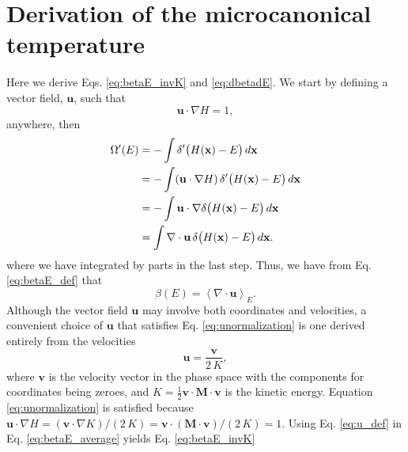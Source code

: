 \documentclass[reprint]{revtex4-1}
\begin{document}
\appendix


\section{Derivation of the microcanonical temperature}


Here we derive Eqs. \eqref{eq:betaE_invK} and \eqref{eq:dbetadE}.
We start by defining a vector field, $\mathbf u$,
such that
%
\begin{equation}
  \mathbf u \cdot \nabla H = 1
  ,
  \label{eq:unormalization}
\end{equation}
%
anywhere, then
%
\begin{align}
  \Omega'(E)
  &= -\int \delta'\bigl( H(\mathbf x) - E \bigr) \, d\mathbf x
     \notag \\
  &= -\int (\mathbf u \cdot \nabla H) \,
           \delta'\bigl( H(\mathbf x) - E \bigr) \, d\mathbf x
     \notag \\
  &= -\int \mathbf u \cdot
           \nabla \delta\bigl( H(\mathbf x) - E \bigr) \, d\mathbf x
     \notag \\
  &= \int \nabla \cdot \mathbf u \,
     \delta\bigl( H(\mathbf x) - E \bigr) \, d\mathbf x
  .
  \notag
\end{align}
%
where we have integrated by parts in the last step.
%
Thus, we have from Eq. \eqref{eq:betaE_def} that
%
\begin{equation}
  \beta(E)
  =
  \left\langle
    \nabla \cdot \mathbf u
  \right\rangle_E
  .
  \label{eq:betaE_average}
\end{equation}
%
Although the vector field $\mathbf u$ may involve both coordinates and velocities,
a convenient choice of $\mathbf u$ that satisfies
Eq. \eqref{eq:unormalization}
is one derived entirely from the velocities
%
\begin{equation}
  \mathbf u
  =
  \frac{ \mathbf v }
       {  2 \, K }
  ,
  \label{eq:u_def}
\end{equation}
where $\mathbf v$ is the velocity vector in the phase space
with the components for coordinates being zeroes,
and $K = \frac 1 2 \mathbf v \cdot \mathbf M \cdot \mathbf v$
is the kinetic energy.
%
Equation \eqref{eq:unormalization} is satisfied
because
$\mathbf u \cdot \nabla H
= (\mathbf v \cdot \nabla K)/(2 \, K)
= \mathbf v \cdot (\mathbf M \cdot \mathbf v) / (2 \, K) = 1$.
%
Using Eq. \eqref{eq:u_def} in Eq. \eqref{eq:betaE_average} yields Eq. \eqref{eq:betaE_invK}
\end{document}
